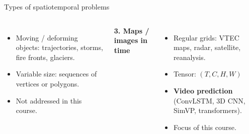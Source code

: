 \documentclass{beamer}
\begin{document}
\begin{frame}{Types of spatiotemporal problems}
\begin{columns}[t]
        \raggedright
        \begin{itemize}
            \item Moving / deforming objects: trajectories, storms, fire fronts, glaciers.
            \item Variable size: sequences of vertices or polygons.
            \item \alert{Not addressed in this course.}
        \end{itemize}

        \centering
        \textbf{3. Maps / images in time}

        \vspace{0.1cm}

        \raggedright
        \begin{itemize}
            \item Regular grids: VTEC maps, radar, satellite, reanalysis.
            \item Tensor: $(T, C, H, W)$
            \item \textbf{Video prediction} (ConvLSTM, 3D CNN, SimVP, transformers).
            \item \alert{Focus of this course.}
        \end{itemize}
    \end{columns}
\end{frame}
\end{document}

